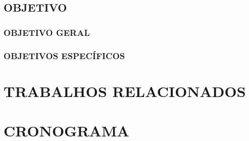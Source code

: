 \documentclass[12pt,a4paper]{article}
\begin{document}
			\lipsum[1]

		\subsection{OBJETIVO}

			\subsubsection{OBJETIVO GERAL}

				\lipsum[1]

			\subsubsection{OBJETIVOS ESPECÍFICOS}

				\lipsum[1]

	\section{TRABALHOS RELACIONADOS}

		\lipsum[1]

	\section{CRONOGRAMA}
\end{document}
